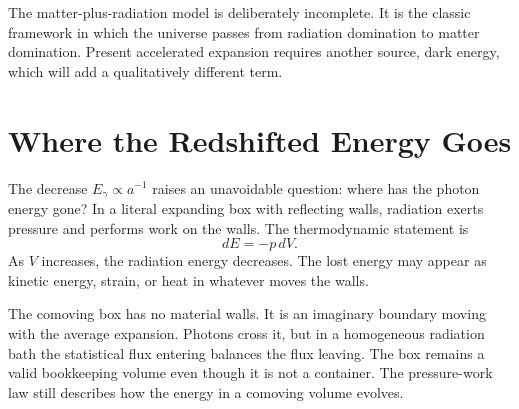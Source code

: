 \begin{classroomqa}
\end{classroomqa}

\begin{classroomqa}
\end{classroomqa}

The matter-plus-radiation model is deliberately incomplete. It is the classic framework in which the universe passes from radiation domination to matter domination. Present accelerated expansion requires another source, dark energy, which will add a qualitatively different term.

\section{Where the Redshifted Energy Goes}

The decrease \(E_\gamma\propto a^{-1}\) raises an unavoidable question: where has the photon energy gone? In a literal expanding box with reflecting walls, radiation exerts pressure and performs work on the walls. The thermodynamic statement is
\begin{equation}
dE=-p\,dV.
\label{eq:c02-pdv}
\end{equation}
As \(V\) increases, the radiation energy decreases. The lost energy may appear as kinetic energy, strain, or heat in whatever moves the walls.

The comoving box has no material walls. It is an imaginary boundary moving with the average expansion. Photons cross it, but in a homogeneous radiation bath the statistical flux entering balances the flux leaving. The box remains a valid bookkeeping volume even though it is not a container. The pressure-work law still describes how the energy in a comoving volume evolves.

